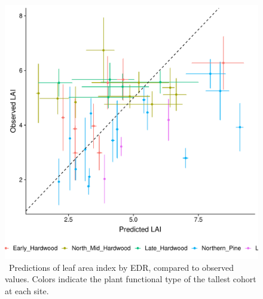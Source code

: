 \begin{figure}
  \centering
  \includegraphics[width=\textwidth]{4_edr/figures/explore_spectra/lai_scatter.pdf}
  \caption{\
    Predictions of leaf area index by EDR, compared to observed values.
    Colors indicate the plant functional type of the tallest cohort at each site.
  }\label{fig:lai_validation}
\end{figure}

